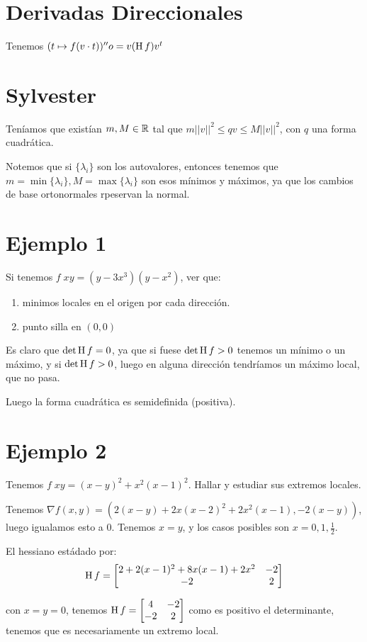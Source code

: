 \documentclass{article}
\begin{document}
\section*{Derivadas Direccionales}
Tenemos $(t \mapsto f (v \cdot t))''o = v (\operatorname{H} f) v^t$

\section*{Sylvester}
Teníamos que existían $m, M \in \mathbb{R}$ tal que $m||v||^2 \leq qv \leq M||v||^2$, con $q$ una forma cuadrática.

Notemos que si $\{\lambda_i\}$ son los autovalores, entonces tenemos que $m = \min \{\lambda_i\}, M = \max \{\lambda_i\}$ son esos mínimos y máximos, ya que los cambios de base ortonormales rpeservan la normal.

\section*{Ejemplo 1}
Si tenemos $f \; xy = (y - 3x^3)(y-x^2)$, ver que:
\begin{enumerate}
	\item minimos locales en el origen por cada dirección.
	\item punto silla en $(0,0)$
\end{enumerate}

Es claro que $\det \operatorname{H} f = 0$, ya que si fuese $\det \operatorname{H} f > 0$ tenemos un mínimo o un máximo, y si $\det \operatorname{H} f > 0$, luego en alguna dirección tendríamos un máximo local, que no pasa.

Luego la forma cuadrática es semidefinida (positiva).
\section*{Ejemplo 2}
Tenemos $f \; xy = (x-y)^2 + x^2(x-1)^2$. Hallar y estudiar sus extremos locales.

Tenemos $\nabla f (x,y) = (2(x-y) + 2x(x-2)^2 + 2x^2(x-1), -2(x-y))$, luego igualamos esto a $0$.
Tenemos $x = y$, y los casos posibles son $x = 0,1,\frac{1}{2}$.

El hessiano estádado por:
\[
	\operatorname{H} f =
	\begin{bmatrix}
		2 + 2(x-1)^2 + 8x(x-1) + 2x^2 & -2\\
		-2 & 2
	\end{bmatrix}
\]

con $x=y=0$, tenemos $\operatorname{H} f = 
\begin{bmatrix}
	4 & -2 \\
	-2 & 2
\end{bmatrix}$ como es positivo el determinante, tenemos que es necesariamente un extremo local.
\end{document}
